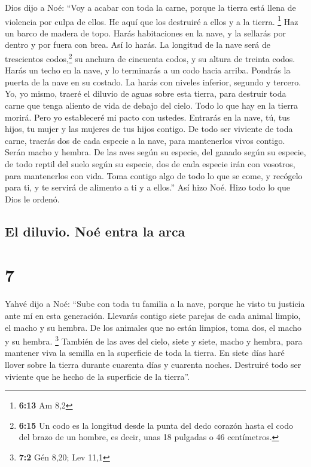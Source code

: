  Dios dijo a Noé: ``Voy a acabar con toda la carne,
porque la tierra está llena de violencia por culpa de ellos. He aquí que
los destruiré a ellos y a la tierra. \footnote{\textbf{6:13} Am 8,2}
 Haz un barco de madera de topo. Harás habitaciones en la
nave, y la sellarás por dentro y por fuera con brea.  Así
lo harás. La longitud de la nave será de trescientos codos,\footnote{\textbf{6:15}
  Un codo es la longitud desde la punta del dedo corazón hasta el codo
  del brazo de un hombre, es decir, unas 18 pulgadas o 46 centímetros.}
su anchura de cincuenta codos, y su altura de treinta codos.
 Harás un techo en la nave, y lo terminarás a un codo
hacia arriba. Pondrás la puerta de la nave en su costado. La harás con
niveles inferior, segundo y tercero.  Yo, yo mismo,
traeré el diluvio de aguas sobre esta tierra, para destruir toda carne
que tenga aliento de vida de debajo del cielo. Todo lo que hay en la
tierra morirá.  Pero yo estableceré mi pacto con ustedes.
Entrarás en la nave, tú, tus hijos, tu mujer y las mujeres de tus hijos
contigo.  De todo ser viviente de toda carne, traerás dos
de cada especie a la nave, para mantenerlos vivos contigo. Serán macho y
hembra.  De las aves según su especie, del ganado según
su especie, de todo reptil del suelo según su especie, dos de cada
especie irán con vosotros, para mantenerlos con vida. 
Toma contigo algo de todo lo que se come, y recógelo para ti, y te
servirá de alimento a ti y a ellos.''  Así hizo Noé. Hizo
todo lo que Dios le ordenó.

\hypertarget{el-diluvio.-nouxe9-entra-la-arca}{%
\subsection{El diluvio. Noé entra la
arca}\label{el-diluvio.-nouxe9-entra-la-arca}}

\hypertarget{section-6}{%
\section{7}\label{section-6}}

 Yahvé dijo a Noé: ``Sube con toda tu familia a la nave,
porque he visto tu justicia ante mí en esta generación. 
Llevarás contigo siete parejas de cada animal limpio, el macho y su
hembra. De los animales que no están limpios, toma dos, el macho y su
hembra. \footnote{\textbf{7:2} Gén 8,20; Lev 11,1} 
También de las aves del cielo, siete y siete, macho y hembra, para
mantener viva la semilla en la superficie de toda la tierra.
 En siete días haré llover sobre la tierra durante
cuarenta días y cuarenta noches. Destruiré todo ser viviente que he
hecho de la superficie de la tierra''.


